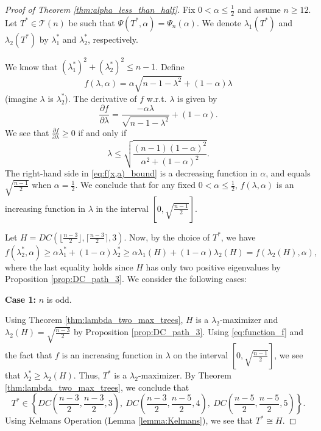 \documentclass[11pt]{article}
\theoremstyle{plain}
\numberwithin{equation}{section}
\begin{document}
\begin{proof}[Proof of Theorem \ref{thm:alpha_less_than_half}]
Fix $0 < \alpha \le \frac{1}{2}$ and assume $n\ge 12$. Let $T^*\in \mathcal{T}(n)$ be such that $\Psi(T^*, \alpha) = \Psi_n(\alpha)$. We denote $\lambda_1(T^*)$ and $\lambda_2(T^*)$ by $\lambda_1^*$ and $\lambda_2^*$, respectively.

We know that $(\lambda_1^*)^2 + (\lambda_2^*)^2\le n-1$. Define 
\[f(\lambda, \alpha) = \alpha\sqrt{n-1-\lambda^2} + (1-\alpha)\lambda\]
(imagine $\lambda$ is $\lambda_2^*$). The derivative of $f$ w.r.t. $\lambda$ is given by 
    \[\frac{\partial f}{\partial \lambda} = \frac{-\alpha \lambda}{\sqrt{n-1-\lambda^2}} + (1-\alpha).\]
We see that $\frac{\partial f}{\partial \lambda}\ge 0$ if and only if 
    \begin{equation}\label{eq:f(x,a)_bound}
       \lambda\le \sqrt{\frac{(n-1)(1-\alpha)^2}{\alpha^2 + (1-\alpha)^2}}. 
    \end{equation}
The right-hand side in \eqref{eq:f(x,a)_bound} is a decreasing function in $\alpha$, and equals $\sqrt{\frac{n-1}{2}}$ when $\alpha = \frac{1}{2}$. We conclude that for any fixed $0<\alpha \le \frac{1}{2}$, $f(\lambda, \alpha)$ is an increasing function in $\lambda$ in the interval $[0,\sqrt{\frac{n-1}{2}}]$. 

Let $H = DC(\lfloor\frac{n-3}{2}\rfloor,\lceil\frac{n-3}{2}\rceil, 3)$.
Now, by the choice of $T^*$, we have
\begin{equation}\label{eq:function_f}
    f(\lambda_2^*, \alpha) \ge \alpha \lambda_1^* + (1-\alpha) \lambda_2^* \ge  \alpha \lambda_1(H) + (1-\alpha)\lambda_2(H) = f(\lambda_2(H), \alpha),
\end{equation}
where the last equality holds since $H$ has only two positive eigenvalues by Proposition \ref{prop:DC_path_3}. We consider the following cases:

\textbf{Case 1:} $n$ is odd. 

Using Theorem \ref{thm:lambda_two_max_trees}, $H$ is a $\lambda_2$-maximizer and $\lambda_2(H) = \sqrt{\frac{n-3}{2}}$ by Proposition \ref{prop:DC_path_3}. Using \eqref{eq:function_f} and the fact that $f$ is an increasing function in $\lambda$ on the interval $[0,\sqrt{\frac{n-1}{2}}]$, we see that $\lambda_2^*\ge \lambda_2(H)$. Thus, $T^*$ is a $\lambda_2$-maximizer. By Theorem \ref{thm:lambda_two_max_trees}, we conclude that 
\[T^*\in \left\{DC\left(\frac{n-3}{2}, \frac{n-3}{2}, 3\right),\ DC\left(\frac{n-3}{2}, \frac{n-5}{2}, 4\right),\ DC\left(\frac{n-5}{2}, \frac{n-5}{2}, 5\right)\right\}.\] Using Kelmans Operation (Lemma \ref{lemma:Kelmans}), we see that $T^*\cong H$.


\end{proof}
\end{document}
